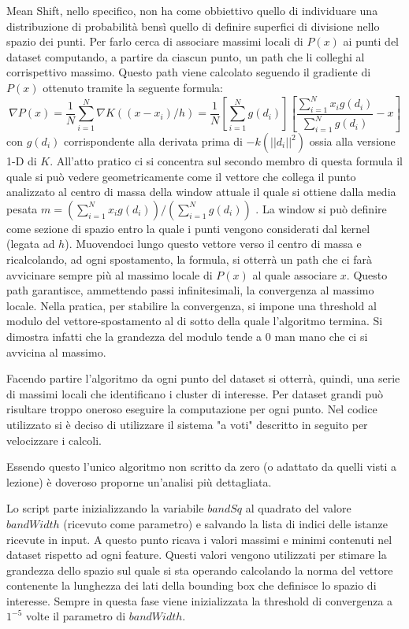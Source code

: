 \documentclass[]{report}
\begin{document}
	Mean Shift, nello specifico, non ha come obbiettivo quello di individuare una distribuzione di probabilità bensì quello di definire superfici di divisione nello spazio dei punti. Per farlo cerca di associare massimi locali di $P(x)$ ai punti del dataset computando, a partire da ciascun punto, un path che li colleghi al corrispettivo massimo. Questo path viene calcolato seguendo il gradiente di $P(x)$ ottenuto tramite la seguente formula:
	$$ \nabla P(x) = \frac{1}{N}\sum_{i=1}^{N}\nabla K((x-x_i)/h) = \frac{1}{N} \left[ \sum_{i=1}^{N} g(d_i) \right] \left[\frac{\sum_{i=1}^{N} x_i g(d_i)}{\sum_{i=1}^{N} g(d_i)} - x \right]$$
	con $g(d_i)$ corrispondente alla derivata prima di $-k(||d_i||^2)$ ossia alla versione 1-D di $K$. 
	All'atto pratico ci si concentra sul secondo membro di questa formula il quale si può vedere geometricamente come il vettore che collega il punto analizzato al centro di massa della window attuale il quale si ottiene dalla media pesata $m= (\sum_{i=1}^{N} x_i g(d_i))/(\sum_{i=1}^{N} g(d_i))$ . La window si può definire come sezione di spazio entro la quale i punti vengono considerati dal kernel (legata ad $h$).  
	Muovendoci lungo questo vettore verso il centro di massa e ricalcolando, ad ogni spostamento, la formula, si otterrà un path che ci farà avvicinare sempre più al massimo locale di $P(x)$ al quale associare $x$. Questo path garantisce, ammettendo passi infinitesimali, la convergenza al massimo locale. Nella pratica, per stabilire la convergenza, si impone una threshold al modulo del vettore-spostamento al di sotto della quale l'algoritmo termina. Si dimostra infatti che la grandezza del modulo tende a $0$ man mano che ci si avvicina al massimo.
	
	Facendo partire l'algoritmo da ogni punto del dataset si otterrà, quindi, una serie di massimi locali che identificano i cluster di interesse. Per dataset grandi può risultare troppo oneroso eseguire la computazione per ogni punto. Nel codice utilizzato si è deciso di utilizzare il sistema "a voti" descritto in seguito per velocizzare i calcoli.
	   
	Essendo questo l'unico algoritmo non scritto da zero (o adattato da quelli visti a lezione) è doveroso proporne un'analisi più dettagliata.
	 
	Lo script parte inizializzando la variabile $bandSq$ al quadrato del valore $bandWidth$ (ricevuto come parametro) e salvando la lista di indici delle istanze ricevute in input. A questo punto ricava i valori massimi e minimi contenuti nel dataset rispetto ad ogni feature. Questi valori vengono utilizzati per stimare la grandezza dello spazio sul quale si sta operando calcolando la norma del vettore contenente la lunghezza dei lati della bounding box che definisce lo spazio di interesse. Sempre in questa fase viene inizializzata la threshold di convergenza a $1^{-5}$ volte il parametro di $bandWidth$.
	
\end{document}
